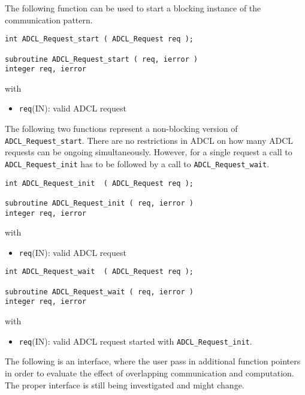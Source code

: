 The following function can be used to start a blocking instance of the communication pattern.
\begin{verbatim}
int ADCL_Request_start ( ADCL_Request req );

subroutine ADCL_Request_start ( req, ierror )
integer req, ierror
\end{verbatim}
with
\begin{itemize}
\item {\tt req}(IN): valid ADCL request
\end{itemize}
\hspace{1cm}

The following two functions represent a non-blocking version of {\tt ADCL\_Request\_start}.
There are no restrictions in ADCL on how many ADCL requests can be ongoing simultaneously. However, for a single request a call to {\tt ADCL\_Request\_init} has to be followed by a call to {\tt ADCL\_Request\_wait}.
\begin{verbatim}
int ADCL_Request_init  ( ADCL_Request req );

subroutine ADCL_Request_init ( req, ierror )
integer req, ierror
\end{verbatim}
with
\begin{itemize}
\item {\tt req}(IN): valid ADCL request
\end{itemize}
\hspace{1cm}

\begin{verbatim}
int ADCL_Request_wait  ( ADCL_Request req );

subroutine ADCL_Request_wait ( req, ierror )
integer req, ierror
\end{verbatim}
with
\begin{itemize}
\item {\tt req}(IN): valid ADCL request started with {\tt ADCL\_Request\_init}.
\end{itemize}
\hspace{1cm}

The following is an interface, where the user pass in additional function pointers in order to evaluate the effect of overlapping communication and computation. The proper interface is still being investigated and might change.

